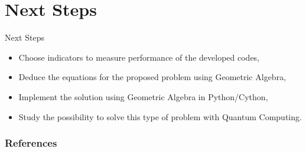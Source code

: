 \documentclass{beamer}
\begin{document}
\section{Next Steps}
\begin{frame}{Next Steps}
  \begin{itemize}
    \item Choose indicators to measure performance of the developed codes,
    \item Deduce the equations for the proposed problem using Geometric Algebra,
    \item Implement the solution using Geometric Algebra in Python/Cython,
    \item Study the possibility to solve this type of problem with Quantum Computing.
  \end{itemize}
\end{frame}

\begin{frame}[allowframebreaks]
  \frametitle{References}
  
  
\end{frame}
\end{document}
